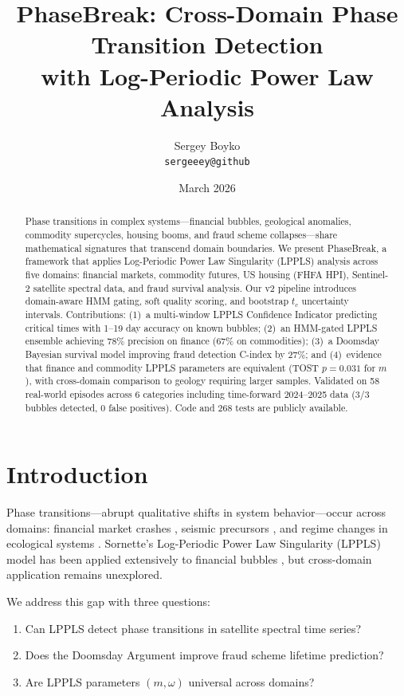 \documentclass[11pt,a4paper]{article}
\title{PhaseBreak: Cross-Domain Phase Transition Detection\\with Log-Periodic Power Law Analysis}
\author{
Sergey Boyko\\
\texttt{sergeeey@github}
}
\date{March 2026}
\begin{document}
\maketitle

\begin{abstract}
Phase transitions in complex systems---financial bubbles, geological anomalies, commodity supercycles, housing booms, and fraud scheme collapses---share mathematical signatures that transcend domain boundaries. We present PhaseBreak, a framework that applies Log-Periodic Power Law Singularity (LPPLS) analysis across five domains: financial markets, commodity futures, US housing (FHFA HPI), Sentinel-2 satellite spectral data, and fraud survival analysis. Our v2 pipeline introduces domain-aware HMM gating, soft quality scoring, and bootstrap $t_c$ uncertainty intervals. Contributions: (1)~a multi-window LPPLS Confidence Indicator predicting critical times with 1--19 day accuracy on known bubbles; (2)~an HMM-gated LPPLS ensemble achieving 78\% precision on finance (67\% on commodities); (3)~a Doomsday Bayesian survival model improving fraud detection C-index by 27\%; and (4)~evidence that finance and commodity LPPLS parameters are equivalent (TOST $p = 0.031$ for $m$), with cross-domain comparison to geology requiring larger samples. Validated on 58 real-world episodes across 6 categories including time-forward 2024--2025 data (3/3 bubbles detected, 0 false positives). Code and 268 tests are publicly available.
\end{abstract}

\section{Introduction}

Phase transitions---abrupt qualitative shifts in system behavior---occur across domains: financial market crashes \citep{sornette2003}, seismic precursors \citep{sornette1998earthquakes, omori1894}, and regime changes in ecological systems \citep{scheffer2009}. Sornette's Log-Periodic Power Law Singularity (LPPLS) model has been applied extensively to financial bubbles \citep{johansen1999, filimonov2013}, but cross-domain application remains unexplored.

We address this gap with three questions:
\begin{enumerate}
    \item Can LPPLS detect phase transitions in satellite spectral time series?
    \item Does the Doomsday Argument improve fraud scheme lifetime prediction?
    \item Are LPPLS parameters $(m, \omega)$ universal across domains?
\end{enumerate}
\end{document}
